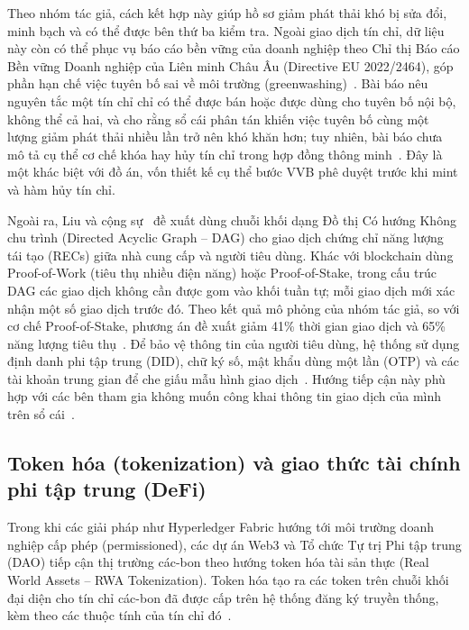 Theo nhóm tác giả, cách kết hợp này giúp hồ sơ giảm phát thải khó bị sửa đổi, minh bạch và có thể được bên thứ ba kiểm tra. Ngoài giao dịch tín chỉ, dữ liệu này còn có thể phục vụ báo cáo bền vững của doanh nghiệp theo Chỉ thị Báo cáo Bền vững Doanh nghiệp của Liên minh Châu Âu (Directive EU 2022/2464), góp phần hạn chế việc tuyên bố sai về môi trường (greenwashing)~\cite{vaccargiu2026blockchain}. Bài báo nêu nguyên tắc một tín chỉ chỉ có thể được bán hoặc được dùng cho tuyên bố nội bộ, không thể cả hai, và cho rằng sổ cái phân tán khiến việc tuyên bố cùng một lượng giảm phát thải nhiều lần trở nên khó khăn hơn; tuy nhiên, bài báo chưa mô tả cụ thể cơ chế khóa hay hủy tín chỉ trong hợp đồng thông minh~\cite{vaccargiu2026blockchain}. Đây là một khác biệt với đồ án, vốn thiết kế cụ thể bước VVB phê duyệt trước khi mint và hàm hủy tín chỉ.

Ngoài ra, Liu và cộng sự~\cite{liu2024blockchain} đề xuất dùng chuỗi khối dạng Đồ thị Có hướng Không chu trình (Directed Acyclic Graph -- DAG) cho giao dịch chứng chỉ năng lượng tái tạo (RECs) giữa nhà cung cấp và người tiêu dùng. Khác với blockchain dùng Proof-of-Work (tiêu thụ nhiều điện năng) hoặc Proof-of-Stake, trong cấu trúc DAG các giao dịch không cần được gom vào khối tuần tự; mỗi giao dịch mới xác nhận một số giao dịch trước đó. Theo kết quả mô phỏng của nhóm tác giả, so với cơ chế Proof-of-Stake, phương án đề xuất giảm 41\% thời gian giao dịch và 65\% năng lượng tiêu thụ~\cite{liu2024blockchain}. Để bảo vệ thông tin của người tiêu dùng, hệ thống sử dụng định danh phi tập trung (DID), chữ ký số, mật khẩu dùng một lần (OTP) và các tài khoản trung gian để che giấu mẫu hình giao dịch~\cite{liu2024blockchain}. Hướng tiếp cận này phù hợp với các bên tham gia không muốn công khai thông tin giao dịch của mình trên sổ cái~\cite{liu2024blockchain}.

\subsection{Token hóa (tokenization) và giao thức tài chính phi tập trung (DeFi)}
\label{sec:token}

Trong khi các giải pháp như Hyperledger Fabric hướng tới môi trường doanh nghiệp cấp phép (permissioned), các dự án Web3 và Tổ chức Tự trị Phi tập trung (DAO) tiếp cận thị trường các-bon theo hướng token hóa tài sản thực (Real World Assets -- RWA Tokenization). Token hóa tạo ra các token trên chuỗi khối đại diện cho tín chỉ các-bon đã được cấp trên hệ thống đăng ký truyền thống, kèm theo các thuộc tính của tín chỉ đó~\cite{toucan2025docs}.


